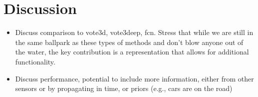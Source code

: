 \section{Discussion} \label{sec:discussion}

\begin{itemize}
  \item Discuss comparison to vote3d, vote3deep, fcn. Stress that
     while we are still in the same ballpark as these types of
    methods and don't blow anyone out of the water, the key contribution is a
    representation that allows for additional functionality.
  \item Discuss performance, potential to include more information, either from
    other sensors or by propagating in time, or priors (e.g., cars are on the road)
\end{itemize}
